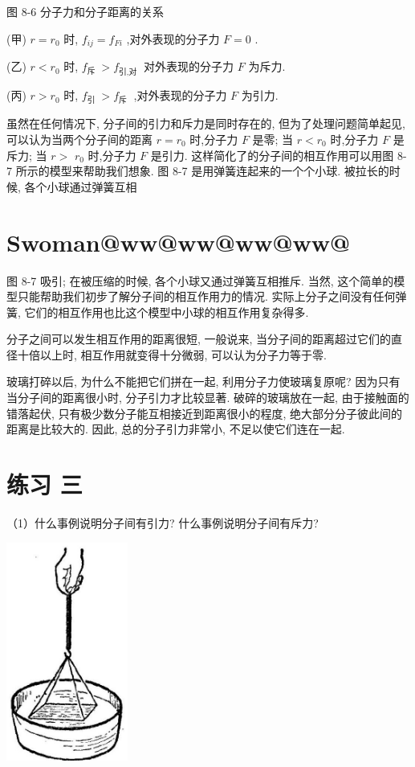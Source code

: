 \documentclass[10pt]{article}
\begin{document}
图 8-6 分子力和分子距离的关系

(甲) \(r = {r}_{0}\) 时, \({f}_{ij} = {f}_{Fi}\) ,对外表现的分子力 \(F = 0\) .

(乙) \(r < {r}_{0}\) 时, \({f}_{\text{斥 }} > {f}_{\text{引,对 }}\) 对外表现的分子力 \(F\) 为斥力.

(丙) \(r > {r}_{0}\) 时, \({f}_{\text{引 }} > {f}_{\text{斥 }}\) ,对外表现的分子力 \(F\) 为引力.

虽然在任何情况下, 分子间的引力和斥力是同时存在的, 但为了处理问题简单起见, 可以认为当两个分子间的距离 \(r = {r}_{0}\) 时,分子力 \(F\) 是零; 当 \(r < {r}_{0}\) 时,分子力 \(F\) 是斥力; 当 \(r >\) \({r}_{0}\) 时,分子力 \(F\) 是引力. 这样简化了的分子间的相互作用可以用图 8-7 所示的模型来帮助我们想象. 图 8-7 是用弹簧连起来的一个个小球. 被拉长的时候, 各个小球通过弹簧互相

\section*{Swoman@ww@ww@ww@ww@}

图 8-7 吸引; 在被压缩的时候, 各个小球又通过弹簧互相推斥. 当然, 这个简单的模型只能帮助我们初步了解分子间的相互作用力的情况. 实际上分子之间没有任何弹簧, 它们的相互作用也比这个模型中小球的相互作用复杂得多.

分子之间可以发生相互作用的距离很短, 一般说来, 当分子间的距离超过它们的直径十倍以上时, 相互作用就变得十分微弱, 可以认为分子力等于零.

玻璃打碎以后, 为什么不能把它们拼在一起, 利用分子力使玻璃复原呢? 因为只有当分子间的距离很小时, 分子引力才比较显著. 破碎的玻璃放在一起, 由于接触面的错落起伏, 只有极少数分子能互相接近到距离很小的程度, 绝大部分分子彼此间的距离是比较大的. 因此, 总的分子引力非常小, 不足以使它们连在一起.

\section*{练习 三}

（1）什么事例说明分子间有引力? 什么事例说明分子间有斥力?

\begin{center}
\includegraphics[max width=0.3\textwidth]{images/01912d55-147c-70aa-b0e0-1782a122f948_242_328772.jpg}
\end{center}
\end{document}

